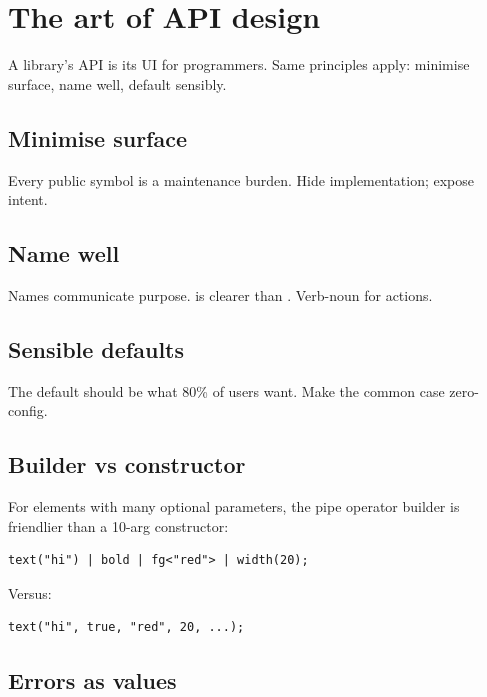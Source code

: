 \chapter{The art of API design}
\label{ch:apidesign}

\begin{aside}
A library's API is its UI for programmers. Same principles
apply: minimise surface, name well, default sensibly.
\end{aside}

\section{Minimise surface}

Every public symbol is a maintenance burden. Hide
implementation; expose intent.

\section{Name well}

Names communicate purpose.  is
clearer than . Verb-noun for actions.

\section{Sensible defaults}

The default should be what 80\% of users want. Make the
common case zero-config.

\section{Builder vs constructor}

For elements with many optional parameters, the pipe
operator builder is friendlier than a 10-arg constructor:

\begin{lstlisting}
text("hi") | bold | fg<"red"> | width(20);
\end{lstlisting}

Versus:

\begin{lstlisting}
text("hi", true, "red", 20, ...);
\end{lstlisting}

\section{Errors as values}

